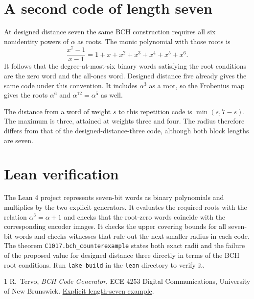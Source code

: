 \documentclass[11pt]{article}
\begin{document}
\section*{A second code of length seven}

At designed distance seven the same BCH construction requires all six
nonidentity powers of $\alpha$ as roots. The monic polynomial with those
roots is
\[
\frac{x^7-1}{x-1}=1+x+x^2+x^3+x^4+x^5+x^6.
\]
It follows that the degree-at-most-six binary words satisfying the root
conditions are the zero word and the all-ones word. Designed distance
five already gives the same code under this convention. It includes
$\alpha^3$ as a root, so the Frobenius map gives the roots $\alpha^6$ and
$\alpha^{12}=\alpha^5$ as well.

The distance from a word of weight $s$ to this repetition code is
$\min(s,7-s)$. The maximum is three, attained at weights three and four.
The radius therefore differs from that of the designed-distance-three
code, although both block lengths are seven.

\section*{Lean verification}

The Lean 4 project represents seven-bit words as binary polynomials and
multiplies by the two explicit generators. It evaluates the required
roots with the relation $\alpha^3=\alpha+1$ and checks that the root-zero
words coincide with the corresponding encoder images. It checks the
upper covering bounds for all seven-bit words and checks witnesses that
rule out the next smaller radius in each code. The theorem
\texttt{C1017.bch\_counterexample} states both exact radii and the failure of
the proposed value for designed distance three directly in terms of the
BCH root conditions. Run \texttt{lake build} in the \texttt{lean}
directory to verify it.

\begin{thebibliography}{1}
R.~Tervo, \emph{BCH Code Generator}, ECE 4253 Digital Communications,
University of New Brunswick.
\href{https://www.ece.unb.ca/cgi-bin/tervo/bch.pl}{Explicit length-seven example}.
\end{thebibliography}
\end{document}
